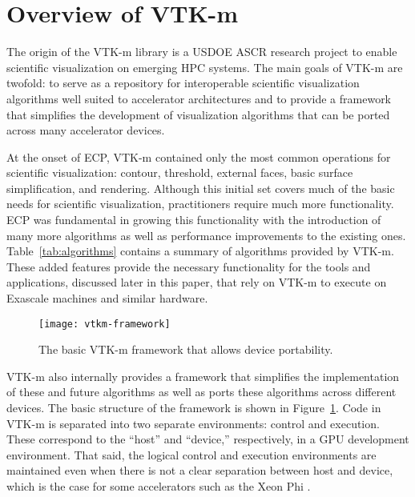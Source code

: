 \section{Overview of VTK-m}


The origin of the VTK-m library \cite{Moreland2016} is a USDOE ASCR research project to enable scientific visualization on emerging HPC systems.
The main goals of VTK-m are twofold: to serve as a repository for interoperable scientific visualization algorithms well suited to accelerator architectures and to provide a framework that simplifies the development of visualization algorithms that can be ported across many accelerator devices.



At the onset of ECP, VTK-m contained only the most common operations for scientific visualization: contour, threshold, external faces, basic surface simplification, and rendering.
Although this initial set covers much of the basic needs for scientific visualization, practitioners require much more functionality.
ECP was fundamental in growing this functionality with the introduction of many more algorithms as well as performance improvements to the existing ones.
Table~\ref{tab:algorithms} contains a summary of algorithms provided by VTK-m.
These added features provide the necessary functionality for the tools and applications, discussed later in this paper, that rely on VTK-m to execute on Exascale machines and similar hardware.

\begin{figure}[htb]
  \texttt{[image: vtkm-framework]}
  \caption{The basic VTK-m framework that allows device portability.}
  \label{fig:vtkm-framework}
\end{figure}

VTK-m also internally provides a framework that simplifies the implementation of these and future algorithms as well as ports these algorithms across different devices.
The basic structure of the framework is shown in Figure~\ref{fig:vtkm-framework}.
Code in VTK-m is separated into two separate environments: control and execution.
These correspond to the ``host'' and ``device,'' respectively, in a GPU development environment.
That said, the logical control and execution environments are maintained even when there is not a clear separation between host and device, which is the case for some accelerators such as the Xeon Phi .

